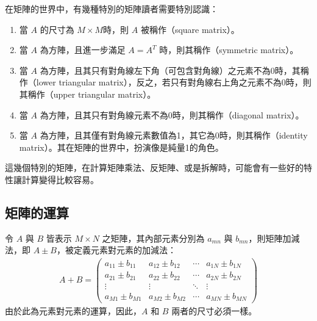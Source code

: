 \documentclass[letterpaper,10pt,english]{sphinxmanual}
\begin{document}
在矩陣的世界中，有幾種特別的矩陣讀者需要特別認識：
\begin{enumerate}
%
\item {} 
當 \(A\) 的尺寸為 \(M \times M\)時，則 \(A\) 被稱作（square matrix）。

\item {} 
當 \(A\) 為方陣，且進一步滿足 \(A = A^T\) 時，則其稱作（symmetric matrix）。

\item {} 
當 \(A\) 為方陣，且其只有對角線左下角（可包含對角線）之元素不為0時，其稱作（lower triangular matrix），反之，若只有對角線右上角之元素不為0時，則其稱作（upper triangular matrix）。

\item {} 
當 \(A\) 為方陣，且其只有對角線元素不為0時，則其稱作（diagonal matrix）。

\item {} 
當 \(A\) 為方陣，且其僅有對角線元素數值為1，其它為0時，則其稱作（identity matrix）。其在矩陣的世界中，扮演像是純量1的角色。

\end{enumerate}

這幾個特別的矩陣，在計算矩陣乘法、反矩陣、或是拆解時，可能會有一些好的特性讓計算變得比較容易。


\subsection{矩陣的運算}
\label{\detokenize{notebook/mathematics-prerequisite:id8}}
令 \(A\) 與 \(B\) 皆表示 \(M \times N\) 之矩陣，其內部元素分別為 \(a_{mn}\) 與 \(b_{mn}\)，則矩陣加減法，即 \(A \pm B\)，被定義元素對元素的加減法：
\begin{equation*}
\begin{split}
A  + B=
 \begin{pmatrix}
  a_{11} \pm b_{11} & a_{12}\pm  b_{12} & \cdots & a_{1N}\pm  b_{1N} \\
  a_{21} \pm  b_{21} & a_{22}\pm  b_{22} & \cdots & a_{2N}\pm  b_{2N} \\
  \vdots  & \vdots  & \ddots & \vdots  \\
  a_{M1} \pm  b_{M1}& a_{M2}\pm  b_{M2} & \cdots & a_{MN}\pm  b_{MN}
 \end{pmatrix}
\end{split}
\end{equation*}
由於此為元素對元素的運算，因此，\(A\) 和 \(B\) 兩者的尺寸必須一樣。
\end{document}
